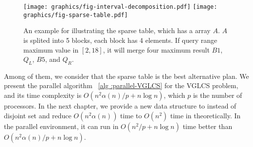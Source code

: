\begin{figure*}[!thb]
  \centering
  \texttt{[image: graphics/fig-interval-decomposition.pdf]}
  \texttt{[image: graphics/fig-sparse-table.pdf]}

  \caption{  
An example for illustrating the sparse table, which has
a array $A$. $A$ is splited into 5 blocks, each block has 4 elements.
If query range maximum value in $[2, 18]$, it will merge four maximum
result $B1$, $Q_L$, $B5$, and $Q_R$.   
}

  \label{fig:interval-decomposition}
\end{figure*}

Among of them, we consider that the sparse table is the best
alternative plan.  We present the parallel algorithm ~\ref{alg
:parallel-VGLCS} for the VGLCS problem, and its time complexity is
$O(n^2 \alpha(n) / p + n \log n)$, which $p$ is the number of
processors. In the next chapter, we provide a new data structure to
instead of disjoint set and reduce $O(n^2 \alpha(n))$ time to $O(n^2)$
time in theoretically.  In the parallel environment, it can run in
$O(n^2 /p + n \log n)$ time better than $O(n^2 \alpha(n)/p + n \log
n)$.

